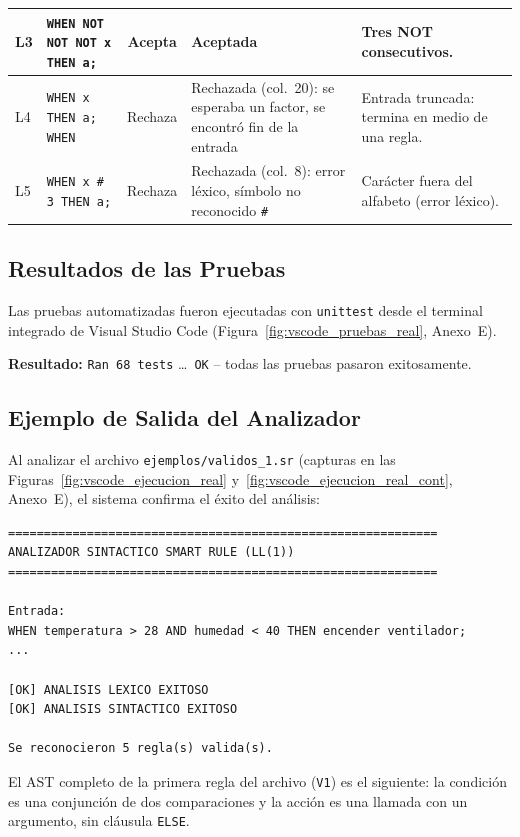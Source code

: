 \documentclass[12pt,a4paper]{article}
\begin{document}
{\begin{longtable}{|l|>{\raggedright\arraybackslash}p{4.5cm}|c|>{\raggedright\arraybackslash}p{4.3cm}|>{\raggedright\arraybackslash}p{3.4cm}|}
L3 & \texttt{WHEN NOT NOT NOT x THEN a;} & Acepta & Aceptada & Tres NOT consecutivos.\\ \hline
L4 & \texttt{WHEN x THEN a; WHEN} & Rechaza & Rechazada (col.~20): se esperaba un factor, se encontró fin de la entrada & Entrada truncada: termina en medio de una regla.\\ \hline
L5 & \texttt{WHEN x \# 3 THEN a;} & Rechaza & Rechazada (col.~8): error léxico, símbolo no reconocido \texttt{\#} & Carácter fuera del alfabeto (error léxico).\\ \hline
\end{longtable}
}

\subsection{Resultados de las Pruebas}
Las pruebas automatizadas fueron ejecutadas con \texttt{unittest} desde el terminal integrado de Visual Studio Code (Figura~\ref{fig:vscode_pruebas_real}, Anexo~E).

\textbf{Resultado:} \texttt{Ran 68 tests} \dots\ \texttt{OK} -- todas las pruebas pasaron exitosamente.

\subsection{Ejemplo de Salida del Analizador}
Al analizar el archivo \texttt{ejemplos/validos\_1.sr} (capturas en las Figuras~\ref{fig:vscode_ejecucion_real} y~\ref{fig:vscode_ejecucion_real_cont}, Anexo~E), el sistema confirma el éxito del análisis:

\begin{lstlisting}[style=grammartyle, caption={Salida exitosa del analizador}]
============================================================
ANALIZADOR SINTACTICO SMART RULE (LL(1))
============================================================

Entrada:
WHEN temperatura > 28 AND humedad < 40 THEN encender ventilador;
...

[OK] ANALISIS LEXICO EXITOSO
[OK] ANALISIS SINTACTICO EXITOSO

Se reconocieron 5 regla(s) valida(s).
\end{lstlisting}

El AST completo de la primera regla del archivo (\texttt{V1}) es el siguiente: la condición es una conjunción de dos comparaciones y la acción es una llamada con un argumento, sin cláusula \texttt{ELSE}.
\end{document}
